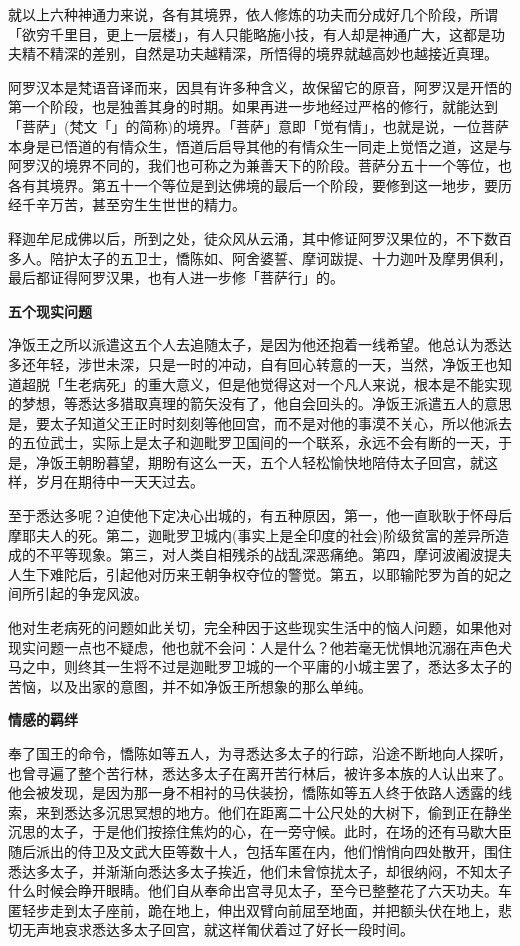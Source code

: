 \documentclass[twoside,openany]{book}
\newcommand{\mt}[1]{\textbullet \textbf{#1}}
\begin{document}
就以上六种神通力来说，各有其境界，依人修炼的功夫而分成好几个阶段，所谓「欲穷千里目，更上一层楼」，有人只能略施小技，有人却是神通广大，这都是功夫精不精深的差别，自然是功夫越精深，所悟得的境界就越高妙也越接近真理。

阿罗汉本是梵语音译而来，因具有许多种含义，故保留它的原音，阿罗汉是开悟的第一个阶段，也是独善其身的时期。如果再进一步地经过严格的修行，就能达到「菩萨」(梵文「」的简称)的境界。「菩萨」意即「觉有情」，也就是说，一位菩萨本身是已悟道的有情众生，悟道后启导其他的有情众生一同走上觉悟之道，这是与阿罗汉的境界不同的，我们也可称之为兼善天下的阶段。菩萨分五十一个等位，也各有其境界。第五十一个等位是到达佛境的最后一个阶段，要修到这一地步，要历经千辛万苦，甚至穷生生世世的精力。

释迦牟尼成佛以后，所到之处，徒众风从云涌，其中修证阿罗汉果位的，不下数百多人。陪护太子的五卫士，憍陈如、阿舍婆誓、摩诃跋提、十力迦叶及摩男俱利，最后都证得阿罗汉果，也有人进一步修「菩萨行」的。

\mt{五个现实问题}

净饭王之所以派遣这五个人去追随太子，是因为他还抱着一线希望。他总认为悉达多还年轻，涉世未深，只是一时的冲动，自有回心转意的一天，当然，净饭王也知道超脱「生老病死」的重大意义，但是他觉得这对一个凡人来说，根本是不能实现的梦想，等悉达多猎取真理的箭矢没有了，他自会回头的。净饭王派遣五人的意思是，要太子知道父王正时时刻刻等他回宫，而不是对他的事漠不关心，所以他派去的五位武士，实际上是太子和迦毗罗卫国间的一个联系，永远不会有断的一天，于是，净饭王朝盼暮望，期盼有这么一天，五个人轻松愉快地陪侍太子回宫，就这样，岁月在期待中一天天过去。

至于悉达多呢？迫使他下定决心出城的，有五种原因，第一，他一直耿耿于怀母后摩耶夫人的死。第二，迦毗罗卫城内(事实上是全印度的社会)阶级贫富的差异所造成的不平等现象。第三，对人类自相残杀的战乱深恶痛绝。第四，摩诃波阇波提夫人生下难陀后，引起他对历来王朝争权夺位的警觉。第五，以耶输陀罗为首的妃之间所引起的争宠风波。

他对生老病死的问题如此关切，完全种因于这些现实生活中的恼人问题，如果他对现实问题一点也不疑虑，他也就不会问：人是什么？他若毫无忧惧地沉溺在声色犬马之中，则终其一生将不过是迦毗罗卫城的一个平庸的小城主罢了，悉达多太子的苦恼，以及出家的意图，并不如净饭王所想象的那么单纯。

\mt{情感的羁绊}

奉了国王的命令，憍陈如等五人，为寻悉达多太子的行踪，沿途不断地向人探听，也曾寻遍了整个苦行林，悉达多太子在离开苦行林后，被许多本族的人认出来了。他会被发现，是因为那一身不相衬的马伕装扮，憍陈如等五人终于依路人透露的线索，来到悉达多沉思冥想的地方。他们在距离二十公尺处的大树下，偷到正在静坐沉思的太子，于是他们按捺住焦灼的心，在一旁守候。此时，在场的还有马歇大臣随后派出的侍卫及文武大臣等数十人，包括车匿在内，他们悄悄向四处散开，围住悉达多太子，并渐渐向悉达多太子挨近，他们未曾惊扰太子，却很纳闷，不知太子什么时候会睁开眼睛。他们自从奉命出宫寻见太子，至今已整整花了六天功夫。车匿轻步走到太子座前，跪在地上，伸出双臂向前屈至地面，并把额头伏在地上，悲切无声地哀求悉达多太子回宫，就这样匍伏着过了好长一段时间。
\end{document}
